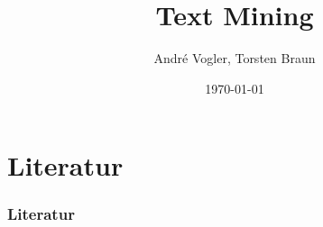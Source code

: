 \documentclass[notes]{beamer}
\title{Text Mining}
\author{Andr\'{e} Vogler, Torsten Braun}
\date{\today}
\begin{document}
	\frame{\titlepage}
	
	

        \section{Literatur}
        \label{sec:literatur}

        \begin{frame}[shrink=5]
          \frametitle{Literatur}
          
          
          
        \end{frame}
\end{document}
